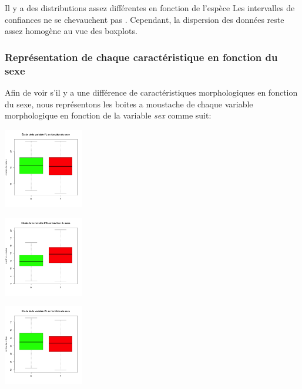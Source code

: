 \documentclass[10pt]{article}
\begin{document}
	Il y a des distributions assez différentes en fonction de l'espèce Les intervalles de confiances ne se chevauchent pas . Cependant, la dispersion des données reste assez homogène au vue des boxplots.
	\subsubsection{Représentation de chaque caractéristique en fonction du sexe}
	
	Afin de voir s'il y a une différence de caractéristiques morphologiques en fonction du sexe, nous représentons les boites a moustache de chaque variable morphologique en fonction de la variable \textit{sex} comme suit:
	
	\begin{center}
		\begin{minipage}[t]{0.3\textwidth}
			\includegraphics[width=35mm]{Figures/Crabs/bxp_sex_fl.png}
		\end{minipage}
		\begin{minipage}[t]{0.3\textwidth}
			\includegraphics[width=35mm]{Figures/Crabs/bxp_sex_rw.png}	
		\end{minipage}
		\begin{minipage}[t]{0.3\textwidth}
			\includegraphics[width=35mm]{Figures/Crabs/bxp_sex_cl.png}
		\end{minipage}
		\newline
		\begin{minipage}[t]{0.4\textwidth}

\end{minipage}
\end{center}
\end{document}
